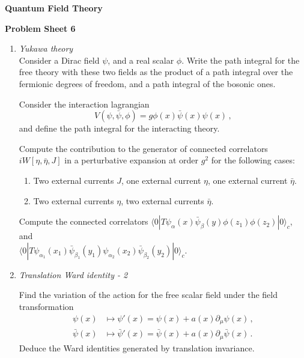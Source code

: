 \documentclass[12pt,a4paper]{article}
\newcommand{\psibar}{\bar{\psi}}
\newcommand{\etabar}{\bar{\eta}}
\begin{document}
\begin{center}
\textbf{ Quantum Field Theory}\\[\baselineskip]
\end{center}
\textbf{ Problem Sheet 6}

\begin{enumerate}
  \item \emph{ Yukawa theory} \\
    
    Consider a Dirac field $\psi$, and a real scalar $\phi$. Write the
    path integral for the free theory with these two fields as the
    product of a path integral over the fermionic degrees of freedom,
    and a path integral of the bosonic ones. 

    Consider the interaction lagrangian
    \[
    V(\psi,\psibar,\phi) = g \phi(x) \psibar(x) \psi(x)\, ,
    \]
    and define the path integral for the interacting theory. 

    Compute the contribution to the generator of connected correlators
    $iW[\eta,\etabar, J]$ in a perturbative expansion at order $g^2$
    for the following cases:
    \begin{enumerate}
    \item Two external currents $J$, one external current $\eta$, one
      external current $\etabar$.
    \item Two external currents $\eta$, two
      external currents $\etabar$.
    \end{enumerate}
    
    Compute the connected correlators
    $\langle 0 | T \psi_\alpha(x) \psibar_\beta(y) \phi(z_1)
    \phi(z_2)| 0 \rangle_c$,
    and \\
    $\langle 0 | T \psi_{\alpha_1}(x_1) \psibar_{\beta_1}(y_1)
    \psi_{\alpha_2}(x_2) \psibar_{\beta_2}(y_2) |0\rangle_c$.

    \bigskip

  \item \emph{ Translation Ward identity - 2}
    
    Find the variation of the action for the free scalar field under
    the field transformation
    \begin{align*}
    \psi(x) &\mapsto \psi'(x) = \psi(x) + a(x) \partial_\mu \psi(x)\,
              , \\
    \psibar(x) &\mapsto \psibar'(x) = \psibar(x) + a(x) \partial_\mu \psibar(x)\,
              .
    \end{align*}
    Deduce the Ward identities generated by translation invariance. 


\end{enumerate}
\end{document}
